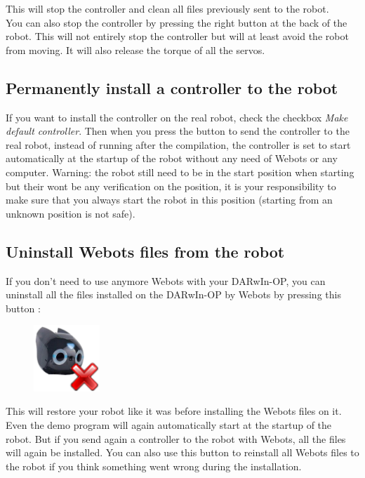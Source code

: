\documentclass[a4paper, 12pt]{article}  		%
\begin{document}
This will stop the controller and clean all files previously sent to the robot.\\

You can also stop the controller by pressing the right button at the back of the robot. This will not entirely stop the controller but will at least avoid the robot from moving. It will also release the torque of all the servos.\\

\subsection{Permanently install a controller to the robot}
If you want to install the controller on the real robot, check the checkbox \textit{Make default controller}. Then when you press the button to send the controller to the real robot, instead of running after the compilation, the controller is set to start automatically at the startup of the robot without any need of Webots or any computer. Warning: the robot still need to be in the start position when starting but their wont be any verification on the position, it is your responsibility to make sure that you always start the robot in this position (starting from an unknown position is not safe).\\

\subsection{Uninstall Webots files from the robot}
If you don't need to use anymore Webots with your DARwIn-OP, you can uninstall all the files installed on the DARwIn-OP by Webots by pressing this button :
\begin{figure}[H]
\begin{center}
\includegraphics[width=2.5cm]{uninstall.png}
\label{uninstall}
\end{center}
\end{figure}

This will restore your robot like it was before installing the Webots files on it. Even the demo program will again automatically start at the startup of the robot. But if you send again a controller to the robot with Webots, all the files will again be installed. You can also use this button to reinstall all Webots files to the robot if you think something went wrong during the installation.\\ 
\end{document}
